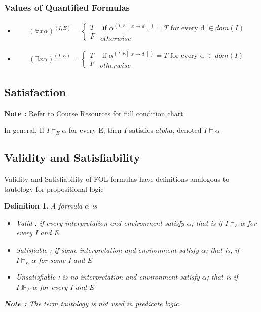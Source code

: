 \documentclass{article}
\newtheorem{definition}[theorem]{Definition}
\begin{document}
\subsubsection{Values of Quantified Formulas}
\begin{itemize}
\item $$ (\forall x \alpha) ^{(I, E)} = \begin{cases} T \\ F \end{cases} \begin{matrix}
\text{ if } \alpha^{(I,E\begin{bmatrix} x \rightarrow d \end{bmatrix})} = T \text { for every d } \in dom(I) \\ otherwise \end{matrix}$$
\item $$ (\exists x \alpha) ^{(I, E)} = \begin{cases} T \\ F \end{cases} \begin{matrix}
\text{ if } \alpha^{(I,E\begin{bmatrix} x \rightarrow d \end{bmatrix})} = T \text { for every d } \in dom(I) \\ otherwise \end{matrix}$$
\end{itemize}

\subsection{Satisfaction}
\textbf{Note : } Refer to Course Resources for full condition chart 

In general, If \(I \models_E \alpha\) for every E, then \(I\) satisfies \(alpha\), denoted \(I \models \alpha\)

\subsection{Validity and Satisfiability}
Validity and Satisfiability of FOL formulas have definitions analogous to tautology for propositional logic 

\begin{definition}
A formula \(\alpha\) is 
\begin{itemize}
\item Valid : if every interpretation and environment satisfy \(\alpha\); that is if \(I \models_E \alpha\) for every I and E 
\item Satisfiable : if some interpretation and environment satisfy \(\alpha\); that is, if \(I \models_E \alpha\) for some I and E
\item Unsatisfiable : is no interpretation and environment satisfy \(\alpha\); that is if \( I \nVdash_E \alpha\) for every I and E 
\end{itemize}

\textbf{Note :} The term tautology is not used in predicate logic. 
\end{definition}
\end{document}
